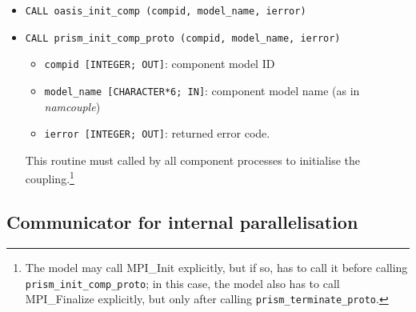 \begin{itemize}

\item {\tt CALL oasis\_init\_comp        (compid, model\_name, ierror)} 
\item {\tt CALL prism\_init\_comp\_proto (compid, model\_name, ierror)} 

 \begin{itemize}
   \item {\tt compid [INTEGER; OUT]}: component model ID 
   \item {\tt model\_name [CHARACTER*6; IN]}: component model name (as in
  {\em namcouple}) 
   \item {\tt ierror [INTEGER; OUT]}: returned error code.
 \end{itemize}
 
This routine must called by all component processes to initialise the
coupling.\footnote{The model may call MPI\_Init explicitly, but if so, has to
call it before calling {\tt prism\_init\_comp\_proto}; in this case, the
model also has to call MPI\_Finalize explicitly, but only after calling
{\tt prism\_terminate\_proto}.}
\end{itemize}

\subsection{Communicator for internal parallelisation}
\label{subsec_MPI1}


